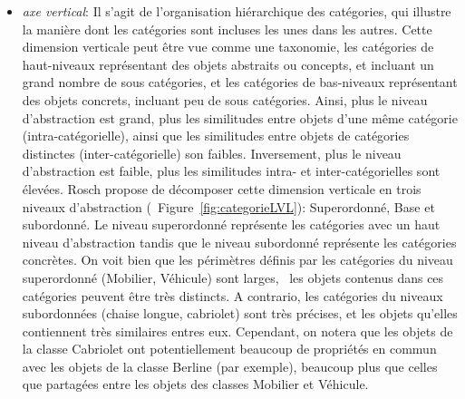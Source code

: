 \begin{itemize}
\item \textit{axe vertical}: Il s'agit de l'organisation hiérarchique des catégories, qui illustre la manière dont les catégories sont incluses les unes dans les autres. Cette dimension verticale peut être vue comme une taxonomie, les catégories de haut-niveaux représentant des objets abstraits ou concepts, et incluant un grand nombre de sous catégories, et les catégories de bas-niveaux représentant des objets concrets, incluant peu de sous catégories. Ainsi, plus le niveau d'abstraction est grand, plus les similitudes entre objets d'une même catégorie (intra-catégorielle), ainsi que les similitudes entre objets de catégories distinctes (inter-catégorielle) son faibles. Inversement, plus le niveau d'abstraction est faible, plus les similitudes intra- et inter-catégorielles sont élevées. Rosch propose de décomposer cette dimension verticale en trois niveaux d'abstraction (\Cf~Figure~\ref{fig:categorieLVL}): Superordonné, Base et subordonné. Le niveau superordonné représente les catégories avec un haut niveau d'abstraction tandis que le niveau subordonné représente les catégories concrètes. On voit bien que les périmètres définis par les catégories du niveau superordonné (Mobilier, Véhicule) sont larges, \ie~les objets contenus dans ces catégories peuvent être très distincts. A contrario, les catégories du niveaux subordonnées (chaise longue, cabriolet) sont très précises, et les objets qu'elles contiennent très similaires entres eux. Cependant, on notera que les objets de la classe Cabriolet ont potentiellement beaucoup de propriétés en commun avec les objets de la classe Berline (par exemple), beaucoup plus que celles que partagées entre les objets des classes Mobilier et Véhicule. 

\end{itemize}
